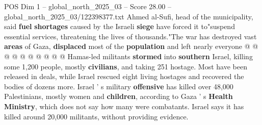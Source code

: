 \begin{textsample}{POS Dim 1 – global\_north\_2025\_03 – Score 28.00 – global\_north\_2025\_03/122398377.txt}
Ahmed al-Sufi, head of the municipality, said \textbf{fuel} \textbf{shortages} caused by the Israeli \textbf{siege} have forced it to"suspend essential services, threatening the lives of thousands."The war has destroyed vast \textbf{areas} of Gaza, \textbf{displaced} most of the \textbf{population} and left nearly everyone @ @ @ @ @ @ @ @ @ @ Hamas-led militants \textbf{stormed} into \textbf{southern} Israel, killing some 1,200 people, mostly \textbf{civilians}, and taking 251 hostage.
Most have been released in deals, while Israel rescued eight living hostages and recovered the bodies of dozens more.
Israel ' s military \textbf{offensive} has killed over 48,000 Palestinians, mostly women and \textbf{children}, according to Gaza ' s \textbf{Health} \textbf{Ministry}, which does not say how many were combatants.
Israel says it has killed around 20,000 militants, without providing evidence.

\end{textsample}
